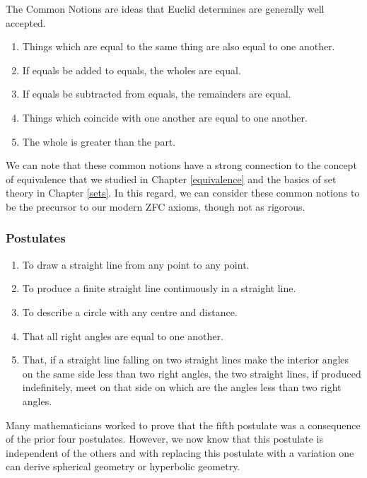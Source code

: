 \documentclass[
]{book}
\providecommand{\tightlist}{%
  \setlength{\itemsep}{0pt}\setlength{\parskip}{0pt}}
\theoremstyle{definition}
\theoremstyle{definition}
\theoremstyle{definition}
\theoremstyle{definition}
\theoremstyle{remark}
\begin{document}
The Common Notions are ideas that Euclid determines are generally well accepted.

\begin{enumerate}
\def\labelenumi{\arabic{enumi}.}
\tightlist
\item
  Things which are equal to the same thing are also equal to one another.
\item
  If equals be added to equals, the wholes are equal.
\item
  If equals be subtracted from equals, the remainders are equal.
\item
  Things which coincide with one another are equal to one another.
\item
  The whole is greater than the part.
\end{enumerate}

We can note that these common notions have a strong connection to the concept of equivalence that we studied in Chapter \ref{equivalence} and the basics of set theory in Chapter \ref{sets}. In this regard, we can consider these common notions to be the precursor to our modern ZFC axioms, though not as rigorous.

\hypertarget{postulates}{%
\subsubsection*{Postulates}\label{postulates}}

\begin{enumerate}
\def\labelenumi{\arabic{enumi}.}
\tightlist
\item
  To draw a straight line from any point to any point.
\item
  To produce a finite straight line continuously in a straight line.
\item
  To describe a circle with any centre and distance.
\item
  That all right angles are equal to one another.
\item
  That, if a straight line falling on two straight lines make the interior angles on the same side less than two right angles, the two straight lines, if produced indefinitely, meet on that side on which are the angles less than two right angles.
\end{enumerate}

Many mathematicians worked to prove that the fifth postulate was a consequence of the prior four postulates. However, we now know that this postulate is independent of the others and with replacing this postulate with a variation one can derive spherical geometry or hyperbolic geometry.
\end{document}
